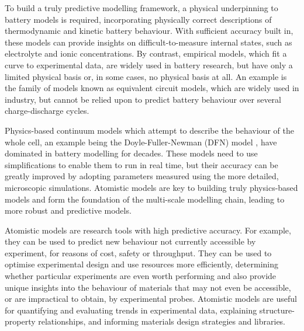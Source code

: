 \documentclass[../main.tex]{subfiles}
\begin{document}
To build a truly predictive modelling framework, a physical underpinning to battery models is required, incorporating physically correct descriptions of thermodynamic and kinetic battery behaviour. With sufficient accuracy built in, these models can provide insights on difficult-to-measure internal states, such as electrolyte and ionic concentrations. By contrast, empirical models, which fit a curve to experimental data, are widely used in battery research, but have only a limited physical basis or, in some cases, no physical basis at all. An example is the family of models known as equivalent circuit models, which are widely used in industry, but cannot be relied upon to predict battery behaviour over several charge-discharge cycles.

Physics-based continuum models which attempt to describe the behaviour of the whole cell, an example being the Doyle-Fuller-Newman (DFN) model \cite{doyle1993modeling,fuller1994simulation,Fuller1994a,Doyle1995,Newman2004}, have dominated in battery modelling for decades. These models need to use simplifications to enable them to run in real time, but their accuracy can be greatly improved by adopting parameters measured using the more detailed, microscopic simulations. Atomistic models are key to building truly physics-based models and form the foundation of the multi-scale modelling chain, leading to more robust and predictive models.
 
Atomistic models are research tools with high predictive accuracy. For example, they can be used to predict new behaviour not currently accessible by experiment, for reasons of cost, safety or throughput. They can be used to optimise experimental design and use resources more efficiently, determining whether particular experiments are even worth performing and also provide unique insights into the behaviour of materials that may not even be accessible, or are impractical to obtain, by experimental probes. Atomistic models are useful for quantifying and evaluating trends in experimental data, explaining structure-property relationships, and informing materials design strategies and libraries.
\end{document}
